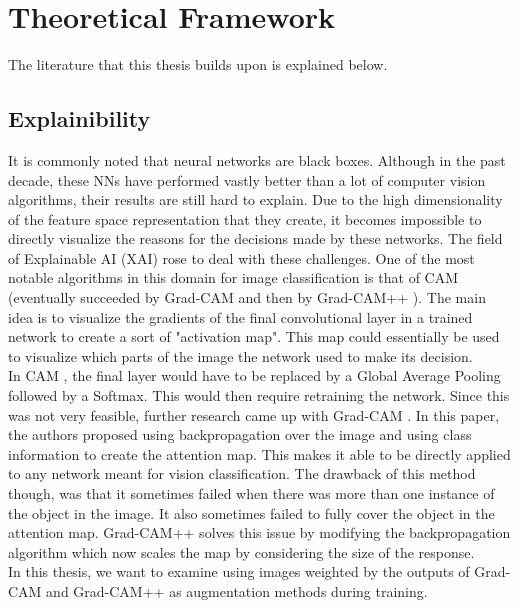 
\section{Theoretical Framework} \label{section:thero}
The literature that this thesis builds upon is explained below. 
\subsection*{Explainibility}
It is commonly noted that neural networks are black boxes. Although in the past decade, these NNs have performed vastly better than a lot of computer vision algorithms, their results are still hard to explain. Due to the high dimensionality of the feature space representation that they create, it becomes impossible to directly visualize the reasons for the decisions made by these networks. The field of Explainable AI (XAI) rose to deal with these challenges. One of the most notable algorithms in this domain for image classification is that of CAM \cite{oquab_is_2015} (eventually succeeded by Grad-CAM \cite{selvaraju_grad-cam_nodate} and then by Grad-CAM++ \cite{chattopadhyay_grad-cam_2018}). The main idea is to visualize the gradients of the final convolutional layer in a trained network to create a sort of "activation map". This map could essentially be used to visualize which parts of the image the network used to make its decision.\\
In CAM \cite{oquab_is_2015}, the final layer would have to be replaced by a Global Average Pooling \cite{lin_network_2014} followed by a Softmax. This would then require retraining the network. Since this was not very feasible, further research came up with Grad-CAM \cite{selvaraju_grad-cam_nodate}. In this paper, the authors proposed using backpropagation over the image and using class information to create the attention map. This makes it able to be directly applied to any network meant for vision classification. The drawback of this method though, was that it sometimes failed when there was more than one instance of the object in the image. It also sometimes failed to fully cover the object in the attention map. Grad-CAM++ \cite{chattopadhyay_grad-cam_2018} solves this issue by modifying the backpropagation algorithm which now scales the map by considering the size of the response.\\
In this thesis, we want to examine using images weighted by the outputs of Grad-CAM and Grad-CAM++ as augmentation methods during training. 
